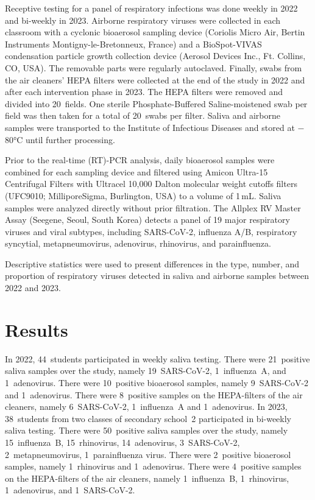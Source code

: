 \documentclass[fleqn,11pt]{wlscirep}
\begin{document}
Receptive testing for a panel of respiratory infections was done weekly in 2022 and bi-weekly in 2023. Airborne respiratory viruses were collected in each classroom with a cyclonic bioaerosol sampling device (Coriolis Micro Air, Bertin Instruments Montigny-le-Bretonneux, France) and a BioSpot-VIVAS condensation particle growth collection device (Aerosol Devices Inc., Ft. Collins, CO, USA)\cite{Lednicky2016AST}. The removable parts were regularly autoclaved. Finally, swabs from the air cleaners' HEPA filters were collected at the end of the study in 2022 and after each intervention phase in 2023. The HEPA filters were removed and divided into 20~fields. One sterile Phosphate-Buffered Saline-moistened swab per field was then taken for a total of 20~swabs per filter. Saliva and airborne samples were transported to the Institute of Infectious Diseases and stored at $-$80°C until further processing\cite{Huber2021}. 

Prior to the real-time (RT)-PCR analysis, daily bioaerosol samples were combined for each sampling device and filtered using Amicon Ultra-15 Centrifugal Filters with Ultracel 10,000 Dalton molecular weight cutoffs filters (UFC9010; MilliporeSigma, Burlington, USA) to a volume of 1\,mL. Saliva samples were analyzed directly without prior filtration. The Allplex RV Master Assay (Seegene, Seoul, South Korea) detects a panel of 19 major respiratory viruses and viral subtypes, including SARS-CoV-2, influenza A/B, respiratory syncytial, metapneumovirus, adenovirus, rhinovirus, and parainfluenza. 

Descriptive statistics were used to present differences in the type, number, and proportion of respiratory viruses detected in saliva and airborne samples between 2022 and 2023.

\section*{Results}

In 2022, 44~students participated in weekly saliva testing. There were 21~positive saliva samples over the study, namely 19~SARS-CoV-2, 1~influenza~A, and 1~adenovirus. There were 10~positive bioaerosol samples, namely 9~SARS-CoV-2 and 1~adenovirus. There were 8~positive samples on the HEPA-filters of the air cleaners, namely 6~SARS-CoV-2, 1~influenza~A and 1~adenovirus. In 2023, 38~students from two classes of secondary school~2 participated in bi-weekly saliva testing. There were 50~positive saliva samples over the study, namely 15~influenza~B, 15~rhinovirus, 14~adenovirus, 3~SARS-CoV-2, 2~metapneumovirus, 1~parainfluenza virus. There were 2~positive bioaerosol samples, namely 1~rhinovirus and 1~adenovirus. There were 4~positive samples on the HEPA-filters of the air cleaners, namely 1~influenza~B, 1~rhinovirus, 1~adenovirus, and 1~SARS-CoV-2. 
\end{document}

